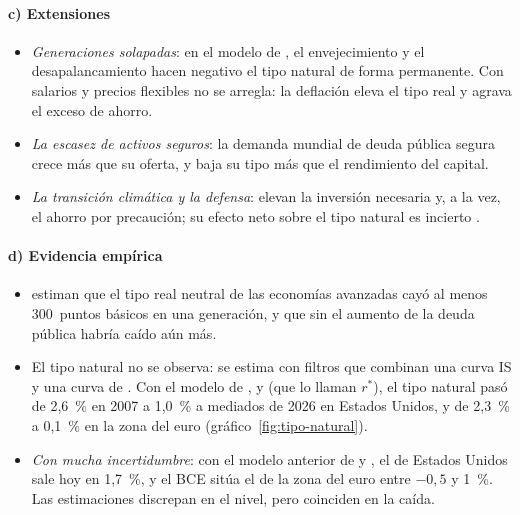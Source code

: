 \documentclass[11pt]{article}
\begin{document}
\paragraph{c) Extensiones}

\begin{itemize}
\item \emph{Generaciones solapadas}: en el modelo de \textcite{EggertssonMehrotraRobbins2019} , el envejecimiento y el desapalancamiento hacen negativo el tipo natural de forma permanente. Con salarios y precios flexibles no se arregla: la deflación eleva el tipo real y agrava el exceso de ahorro.
\item \emph{La escasez de activos seguros}: la demanda mundial de deuda pública segura crece más que su oferta, y baja su tipo más que el rendimiento del capital\nocite{CaballeroFarhiGourinchas2017Safe}.
\item \emph{La transición climática y la defensa}: elevan la inversión necesaria y, a la vez, el ahorro por precaución; su efecto neto sobre el tipo natural es incierto .
\end{itemize}

\paragraph{d) Evidencia empírica}

\begin{itemize}
\item \textcite{RachelSummers2019Secular} estiman que el tipo real neutral de las economías avanzadas cayó al menos 300~puntos básicos en una generación, y que sin el aumento de la deuda pública habría caído aún más.
\item El tipo natural no se observa: se estima con filtros que combinan una curva IS y una curva de \nocite{LaubachWilliams2003,HolstonLaubachWilliams2017Measuring} . Con el modelo de ,  y  (que lo llaman $r^*$), el tipo natural pasó de 2,6~\% en 2007 a 1,0~\% a mediados de 2026 en Estados Unidos, y de 2,3~\% a 0,1~\% en la zona del euro (gráfico~\ref{fig:tipo-natural})\nocite{HolstonLaubachWilliams2023Covid,FedNY2026HLW}.
\item \emph{Con mucha incertidumbre}: con el modelo anterior de  y , el de Estados Unidos sale hoy en 1,7~\%, y el BCE sitúa el de la zona del euro entre $-0{,}5$ y 1~\%\nocite{FedNY2026HLW,BrandLisackMazelis2025Natural}. Las estimaciones discrepan en el nivel, pero coinciden en la caída.
\end{itemize}
\end{document}
